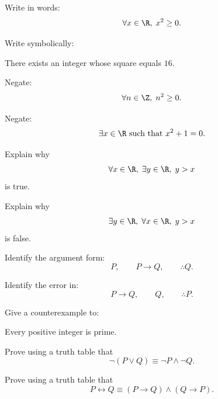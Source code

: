 \begin{exercise}[1]
Write in words:
\[ \forall x\in\R,\;x^2\geq0. \]
\end{exercise}

\begin{exercise}[1]
Write symbolically:

\begin{center}
There exists an integer whose square equals \(16\).
\end{center}
\end{exercise}

\begin{exercise}[2]
Negate:
\[ \forall n\in\Z,\;n^2\geq0. \]
\end{exercise}

\begin{exercise}[2]
Negate:
\[ \exists x\in\R\text{ such that }x^2+1=0. \]
\end{exercise}

\begin{exercise}[2]
Explain why
\[ \forall x\in\R,\;\exists y\in\R,\;y>x \]
is true.
\end{exercise}

\begin{exercise}[2]
Explain why
\[ \exists y\in\R,\;\forall x\in\R,\;y>x \]
is false.
\end{exercise}

\begin{exercise}[2]
Identify the argument form:
\[ P,\qquad P\to Q,\qquad \therefore Q. \]
\end{exercise}

\begin{exercise}[2]
Identify the error in:
\[ P\to Q,\qquad Q,\qquad \therefore P. \]
\end{exercise}

\begin{exercise}[2]
Give a counterexample to:

\begin{center}
Every positive integer is prime.
\end{center}
\end{exercise}

\begin{exercise}[3]
Prove using a truth table that
\[ \neg(P\lor Q)\equiv\neg P\land\neg Q. \]
\end{exercise}

\begin{exercise}[3]
Prove using a truth table that
\[ P\leftrightarrow Q\equiv(P\to Q)\land(Q\to P). \]
\end{exercise}

